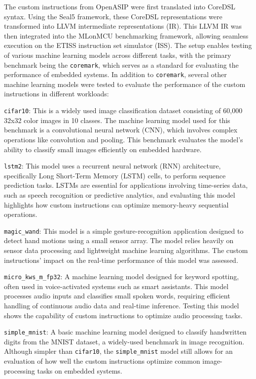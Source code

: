 The custom instructions from OpenASIP were first translated into CoreDSL syntax. Using the Seal5 framework, these CoreDSL representations were transformed into LLVM intermediate representations (IR). This LLVM IR was then integrated into the MLonMCU benchmarking framework, allowing seamless execution on the ETISS instruction set simulator (ISS). The setup enables testing of various machine learning models across different tasks, with the primary benchmark being the \texttt{coremark}, which serves as a standard for evaluating the performance of embedded systems. In addition to \texttt{coremark}, several other machine learning models were tested to evaluate the performance of the custom instructions in different workloads:

\texttt{cifar10}: This is a widely used image classification dataset consisting of 60,000 32x32 color images in 10 classes. The machine learning model used for this benchmark is a convolutional neural network (CNN), which involves complex operations like convolution and pooling. This benchmark evaluates the model's ability to classify small images efficiently on embedded hardware.

\texttt{lstm2}: This model uses a recurrent neural network (RNN) architecture, specifically Long Short-Term Memory (LSTM) cells, to perform sequence prediction tasks. LSTMs are essential for applications involving time-series data, such as speech recognition or predictive analytics, and evaluating this model highlights how custom instructions can optimize memory-heavy sequential operations.

\texttt{magic\_wand}: This model is a simple gesture-recognition application designed to detect hand motions using a small sensor array. The model relies heavily on sensor data processing and lightweight machine learning algorithms. The custom instructions' impact on the real-time performance of this model was assessed.

\texttt{micro\_kws\_m\_fp32}: A machine learning model designed for keyword spotting, often used in voice-activated systems such as smart assistants. This model processes audio inputs and classifies small spoken words, requiring efficient handling of continuous audio data and real-time inference. Testing this model shows the capability of custom instructions to optimize audio processing tasks.

\texttt{simple\_mnist}: A basic machine learning model designed to classify handwritten digits from the MNIST dataset, a widely-used benchmark in image recognition. Although simpler than \texttt{cifar10}, the \texttt{simple\_mnist} model still allows for an evaluation of how well the custom instructions optimize common image-processing tasks on embedded systems.

